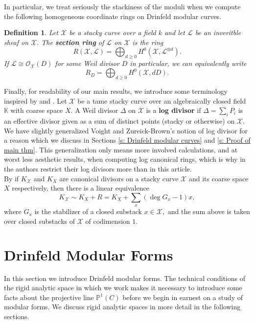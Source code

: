 \documentclass[11pt]{amsart}
\newtheorem{definition}[theorem]{Definition}
\theoremstyle{definition}
\numberwithin{equation}{section}
\newcommand{\cO}{\mathcal{O}}		%
\newcommand{\sL}{\mathscr{L}}		%
\newcommand{\sX}{\mathscr{X}}		%
\newcommand{\bbK}{\mathbb{K}}		%
\newcommand{\bbP}{\mathbb{P}}		%
\begin{document}
		In particular, we treat seriously the stackiness of the moduli when we compute the following homogeneous coordinate rings on Drinfeld modular curves.  
		\begin{definition}
			Let $\sX$ be a stacky curve over a field $k$ and let $\sL$ be an inveritble sheaf on $\sX.$ The \textbf{section ring} of $\sL$ on $\sX$ is the ring 
			\[R(\sX,\sL)=\bigoplus_{d\geq 0}H^0(\sX,\sL^{\otimes d}).\]
			If $\sL\cong \cO_{\sX}(D)$ for some Weil divisor $D$ in particular, we can equivalently write 
			\[R_D=\bigoplus_{d\geq 0}H^0(\sX,dD).
			\]
		\end{definition}		
		
		Finally, for readability of our main results, we introduce some terminology inspired by \cite[Definition $5.6.2$]{VZB} and \cite[Proposition $5.5.6$]{VZB}. Let $\sX$ be a tame stacky curve over an algebraically closed field $\bbK$ with coarse space $X.$ A Weil divisor $\Delta$ on $\sX$ is a \textbf{log divisor} if $\Delta=\sum_i P_i$ is an effective divisor given as a sum of distinct points (stacky or otherwise) on $\sX.$ We have slightly generalized Voight and Zureick-Brown's notion of log divisor for a reason which we discuss in Sections \ref{s: Drinfeld modular curves} and \ref{s: Proof of main thm}. This generalization only means more involved calculations, and at worst less aesthetic results, when computing log canonical rings, which is why in \cite[Remark $5.4.6$]{VZB} the authors restrict their log divisors more than in this article.\\ 
		
		By \cite[Proposition $5.5.6$]{VZB} if $K_{\sX}$ and $K_X$ are canonical divisors on a stacky curve $\sX$ and its coarse space $X$ respectively, then there is a linear equivalence
		\[K_{\sX}\sim K_X+R=K_X+\sum_x \left(\deg G_x-1\right)x,\]
		where $G_x$ is the stabilizer of a closed substack $x\in \sX,$ and the sum above is taken over closed substacks of $\sX$ of codimension $1.$

		
		\section{Drinfeld Modular Forms}
		
		In this section we introduce Drinfeld modular forms. The technical conditions of the rigid analytic space in which we work makes it necessary to introduce some facts about the projective line $\bbP^1(C)$ before we begin in earnest on a study of modular forms. We discuss rigid analytic spaces in more detail in the following sections.
		
\end{document}
